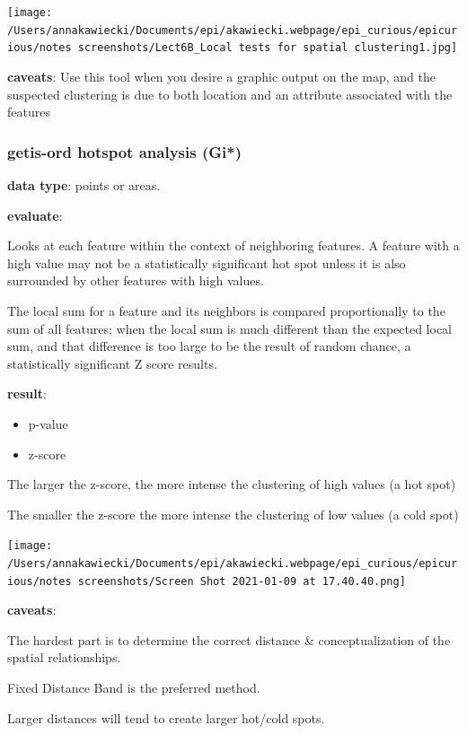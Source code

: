 \documentclass[
]{article}
\begin{document}
\texttt{[image: /Users/annakawiecki/Documents/epi/akawiecki.webpage/epi\_curious/epicurious/notes screenshots/Lect6B\_Local tests for spatial clustering1.jpg]}

\textbf{caveats}: Use this tool when you desire a graphic output on the
map, and the suspected clustering is due to both location and an
attribute associated with the features

\hypertarget{getis-ord-hotspot-analysis-gi}{%
\subsubsection{getis-ord hotspot analysis
(Gi*)}\label{getis-ord-hotspot-analysis-gi}}

\textbf{data type}: points or areas.

\textbf{evaluate}:

Looks at each feature within the context of neighboring features. A
feature with a high value may not be a statistically significant hot
spot unless it is also surrounded by other features with high values.

The local sum for a feature and its neighbors is compared proportionally
to the sum of all features; when the local sum is much different than
the expected local sum, and that difference is too large to be the
result of random chance, a statistically significant Z score results.

\textbf{result}:

\begin{itemize}
\item
  p-value
\item
  z-score
\end{itemize}

The larger the z-score, the more intense the clustering of high values
(a hot spot)

The smaller the z-score the more intense the clustering of low values (a
cold spot)

\texttt{[image: /Users/annakawiecki/Documents/epi/akawiecki.webpage/epi\_curious/epicurious/notes screenshots/Screen Shot 2021-01-09 at 17.40.40.png]}

\textbf{caveats}:

The hardest part is to determine the correct distance \&
conceptualization of the spatial relationships.

Fixed Distance Band is the preferred method.

Larger distances will tend to create larger hot/cold spots.
\end{document}

